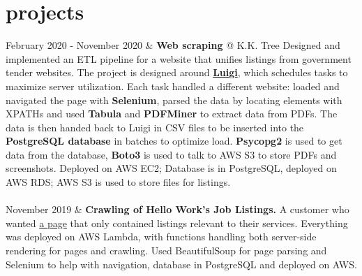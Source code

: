 \documentclass[]{cv-roald}
\begin{document}
                    
    

\section*{projects}
\begin{tabularcv}
    February 2020 - November 2020 &       \textbf{Web scraping} @ K.K. Tree\newline 
                                Designed and implemented an ETL pipeline for a website that unifies listings from government tender websites.
                                The project is designed around \href{https://luigi.readthedocs.io/en/stable/}{\textbf{Luigi}}, which schedules tasks to maximize server utilization. Each task handled a different website: loaded and navigated the page with \textbf{Selenium}, parsed the data by locating elements with XPATHs and used \textbf{Tabula} and \textbf{PDFMiner} to extract data from PDFs. The data is then handed back to Luigi in CSV files to be inserted into the \textbf{PostgreSQL database} in batches to optimize load. \textbf{Psycopg2} is used to get data from the database, \textbf{Boto3} is used to talk to AWS S3 to store PDFs and screenshots.
                                \newline Deployed on AWS EC2; Database is in PostgreSQL, deployed on AWS RDS; AWS S3 is used to store files for listings.
    \\[\vspacepar]
    \\[\vspacepar]

    November 2019 &             \textbf{Crawling of Hello Work's Job Listings.}\newline 
                                A customer who wanted \href{https://www.oshigoto-shokai.jp/}{a page} that only contained listings relevant to their services. \newline 
                                Everything was deployed on AWS Lambda, with functions handling both server-side rendering for pages and crawling. Used BeautifulSoup for page parsing and Selenium to help with navigation, database in PostgreSQL and deployed on AWS.
    \\[\vspacepar]
    

\end{tabularcv}
\end{document}
